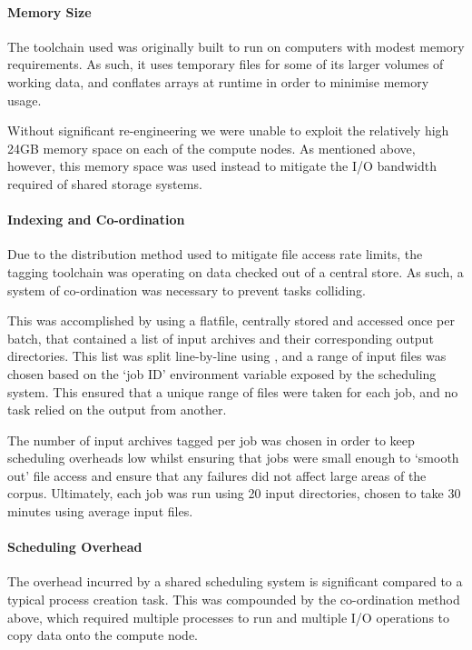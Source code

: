 \paragraph{Memory Size}
The toolchain used was originally built to run on computers with modest memory requirements.  As such, it uses temporary files for some of its larger volumes of working data, and conflates arrays at runtime in order to minimise memory usage.

Without significant re-engineering we were unable to exploit the relatively high 24GB memory space on each of the compute nodes.  As mentioned above, however, this memory space was used instead to mitigate the I/O bandwidth required of shared storage systems.






\paragraph{Indexing and Co-ordination}
Due to the distribution method used to mitigate file access rate limits, the tagging toolchain was operating on data checked out of a central store.  As such, a system of co-ordination was necessary to prevent tasks colliding.

This was accomplished by using a flatfile, centrally stored and accessed once per batch, that contained a list of input archives and their corresponding output directories.  This list was split line-by-line using , and a range of input files was chosen based on the `job ID' environment variable exposed by the scheduling system.  This ensured that a unique range of files were taken for each job, and no task relied on the output from another.

The number of input archives tagged per job was chosen in order to keep scheduling overheads low whilst ensuring that jobs were small enough to `smooth out' file access and ensure that any failures did not affect large areas of the corpus.  Ultimately, each job was run using 20 input directories, chosen to take 30 minutes using average input files.




\paragraph{Scheduling Overhead}
The overhead incurred by a shared scheduling system is significant compared to a typical process creation task.  This was compounded by the co-ordination method above, which required multiple processes to run and multiple I/O operations to copy data onto the compute node.

